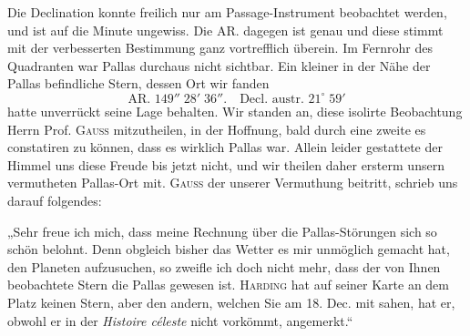 \par\indent Die Declination konnte freilich nur am Passage-Instrument beobachtet werden, und ist auf die Minute ungewiss. Die AR. dagegen ist genau und diese stimmt mit der verbesserten Bestimmung ganz vortrefflich überein. Im Fernrohr des Quadranten war Pallas durchaus nicht sichtbar. Ein kleiner in der Nähe der Pallas befindliche Stern, dessen Ort wir fanden
\[\text{AR. }149''\;28'\;36''.\quad\text{Decl. austr. }21^\circ\;59'\]
\noindent hatte unverrückt seine Lage behalten. Wir standen an, diese isolirte Beobachtung Herrn Prof. \textsc{Gauss} mitzutheilen, in der Hoffnung, bald durch eine zweite es constatiren zu können, dass es wirklich Pallas war. Allein leider gestattete der Himmel uns diese Freude bis jetzt nicht, und wir theilen daher ersterm unsern vermutheten Pallas-Ort mit. \textsc{Gauss} der unserer Vermuthung beitritt, schrieb uns darauf folgendes:

\par\indent „Sehr freue ich mich, dass meine Rechnung über die Pallas-Störungen sich so schön belohnt. Denn obgleich bisher das Wetter es mir unmöglich gemacht hat, den Planeten aufzusuchen, so zweifle ich doch nicht mehr, dass der von Ihnen beobachtete Stern die Pallas gewesen ist. \textsc{Harding} hat auf seiner Karte an dem Platz keinen Stern, aber den andern, welchen Sie am 18. Dec. mit sahen, hat er, obwohl er in der \emph{Histoire céleste} nicht vorkömmt, angemerkt.“
